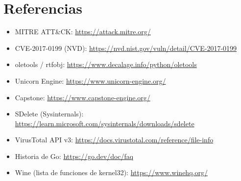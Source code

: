 \documentclass[11pt,a4paper]{article}
\begin{document}
\section{Referencias}
\begin{itemize}\small
  \item MITRE ATT\&CK: \url{https://attack.mitre.org/}
  \item CVE-2017-0199 (NVD): \url{https://nvd.nist.gov/vuln/detail/CVE-2017-0199}
  \item oletools / rtfobj: \url{https://www.decalage.info/python/oletools}
  \item Unicorn Engine: \url{https://www.unicorn-engine.org/}
  \item Capstone: \url{https://www.capstone-engine.org/}
  \item SDelete (Sysinternals): \url{https://learn.microsoft.com/sysinternals/downloads/sdelete}
  \item VirusTotal API v3: \url{https://docs.virustotal.com/reference/file-info}
  \item Historia de Go: \url{https://go.dev/doc/faq}
  \item Wine (lista de funciones de kernel32): \url{https://www.winehq.org/}
\end{itemize}
\end{document}
